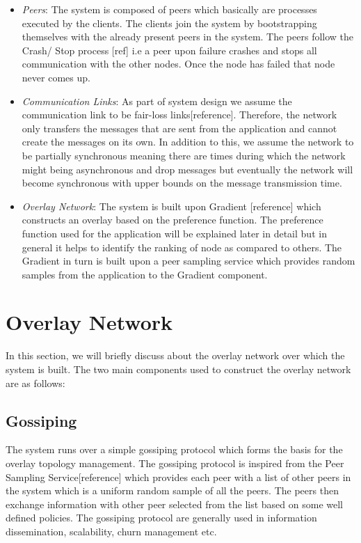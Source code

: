 \documentclass[12pt,a4paper,twoside,openright]{book}
\begin{document}
\begin{itemize}

\item \textit{Peers}: The system is composed of peers which basically are processes executed by the clients. The clients join the system by bootstrapping themselves with the already present peers in the system. The peers follow the Crash/ Stop process [ref] i.e a peer upon failure crashes and stops all communication with the other nodes. Once the node has failed that node never comes up. 


\item \textit{Communication Links}: As part of system design we assume the communication link to be fair-loss links[reference]. Therefore, the network only transfers the messages that are sent from the application and cannot create the messages on its own. In addition to this, we assume the network to be partially synchronous meaning there are times during which the network might being asynchronous and drop messages but eventually the network will become synchronous with upper bounds on the message transmission time.

\item \textit{Overlay Network}: The system is built upon Gradient [reference] which constructs an overlay based on the preference function. The preference function used for the application will be explained later in detail but in general it helps to identify the ranking of node as compared to others. The Gradient in turn is built upon a peer sampling service which provides random samples from the application to the Gradient component.

\end{itemize}



\section{Overlay Network}
In this section, we will briefly discuss about the overlay network over which the system is built. The two main components used to construct the overlay network are as follows: 

\subsection{Gossiping}
The system runs over a simple gossiping protocol which forms the basis for the overlay topology management. The gossiping protocol is inspired from the Peer Sampling Service[reference] which provides each peer with a list of other peers in the system which is a uniform random sample of all the peers. The peers then exchange information with other peer selected from the list based on some well defined policies. The gossiping protocol are generally used in information dissemination, scalability, churn management etc.
\end{document}
